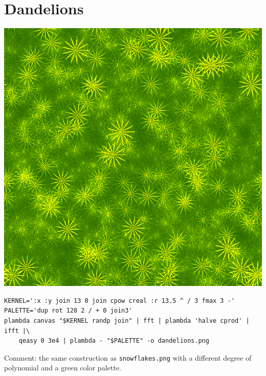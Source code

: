 \section{Dandelions}
\includegraphics{dandelions.png}
\begin{verbatim}
KERNEL=':x :y join 13 0 join cpow creal :r 13.5 ^ / 3 fmax 3 -'
PALETTE='dup rot 128 2 / + 0 join3'
plambda canvas "$KERNEL randp join" | fft | plambda 'halve cprod' | ifft |\
	qeasy 0 3e4 | plambda - "$PALETTE" -o dandelions.png
\end{verbatim}
Comment: the same construction as \verb+snowflakes.png+ with a different
degree of polynomial and a green color palette.


